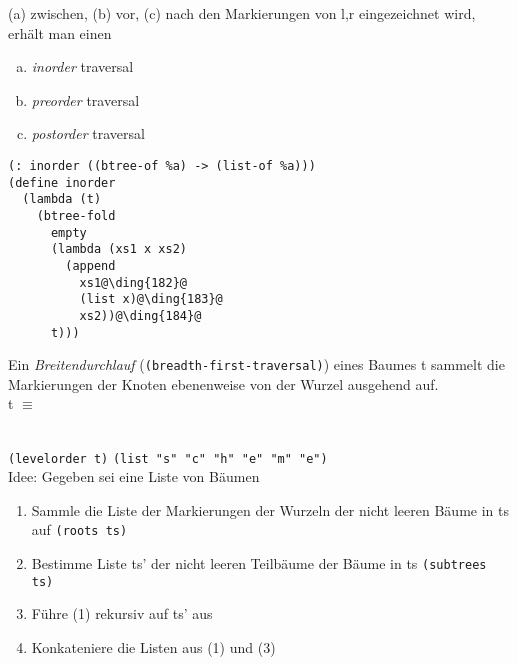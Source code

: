 (a) zwischen, (b) vor, (c) nach den Markierungen von l,r eingezeichnet wird, erhält man einen
\begin{enumerate}[(a)]
\item \emph{inorder} traversal \qquad {}
\item \emph{preorder} traversal \qquad {} 
\item \emph{postorder} traversal \qquad {}
\end{enumerate}
\begin{lstlisting}[literate={}]
(: inorder ((btree-of %a) -> (list-of %a)))
(define inorder
  (lambda (t)
    (btree-fold
      empty
      (lambda (xs1 x xs2)
        (append 
          xs1@\ding{182}@
          (list x)@\ding{183}@
          xs2))@\ding{184}@
      t)))
\end{lstlisting}
Ein \emph{Breitendurchlauf} (\lstinline|(breadth-first-traversal)|) eines Baumes t sammelt die Markierungen der Knoten ebenenweise von der Wurzel ausgehend auf.\\
t $\equiv$ \begin{minipage}[c]{0.9\textwidth}
\end{minipage}\bigskip\\
\lstinline|(levelorder t)| \eval \lstinline|(list "s" "c" "h" "e" "m" "e")|\\
Idee: Gegeben sei eine Liste von Bäumen
\begin{enumerate}[(1)]
\item Sammle die Liste der Markierungen der Wurzeln der nicht leeren Bäume in ts auf \lstinline|(roots ts)|
\item Bestimme Liste ts' der nicht leeren Teilbäume der Bäume in ts \lstinline|(subtrees ts)|
\item Führe (1) rekursiv auf ts' aus
\item Konkateniere die Listen aus (1) und (3)
\end{enumerate}